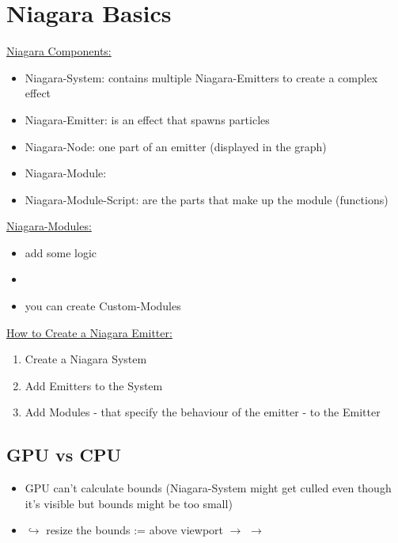     \section{Niagara Basics}
            \uline{Niagara Components:}
            \begin{itemize}
                \item Niagara-System: contains multiple Niagara-Emitters to create a complex effect
                \item Niagara-Emitter: is an effect that spawns particles
                \item Niagara-Node: one part of an emitter (displayed in the graph)
                \item Niagara-Module: 
                \item Niagara-Module-Script: are the parts that make up the module (functions)
            \end{itemize}
            \uline{Niagara-Modules:}
            \begin{itemize}
                \item add some logic
                \item 
                \item you can create Custom-Modules
            \end{itemize}
            \uline{How to Create a Niagara Emitter:}
            \begin{enumerate}
                \item Create a Niagara System
                \item Add Emitters to the System
                \item Add Modules - that specify the behaviour of the emitter - to the Emitter
            \end{enumerate}

        \subsection{GPU vs CPU}
                \begin{itemize}
                    \item GPU can't calculate bounds (Niagara-System might get culled even though it's visible but bounds might be too small)
                    \item $\hookrightarrow$ resize the bounds := above viewport  $\rightarrow$  $\rightarrow$ 
                \end{itemize}
            
